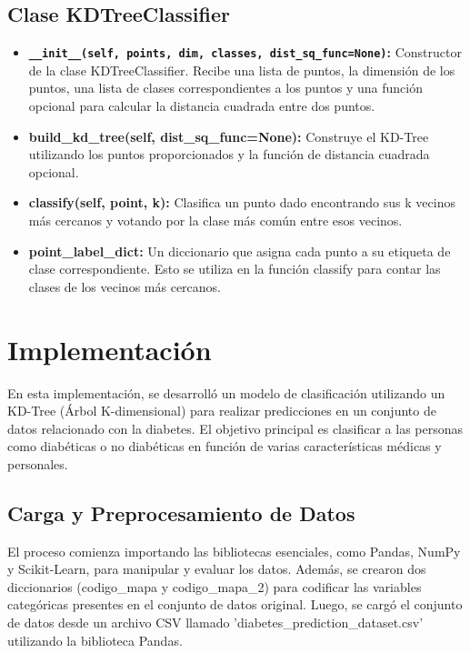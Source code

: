 \documentclass[]{article}
\begin{document}
\subsection{Clase KDTreeClassifier}
\begin{itemize}
	\item \textbf{\lstinline|__init__(self, points, dim, classes, dist_sq_func=None)|:} Constructor de la clase KDTreeClassifier. Recibe una lista de puntos, la dimensión de los puntos, una lista de clases correspondientes a los puntos y una función opcional para calcular la distancia cuadrada entre dos puntos.
	\item \textbf{build\_kd\_tree(self, dist\_sq\_func=None):} Construye el KD-Tree utilizando los puntos proporcionados y la función de distancia cuadrada opcional.
	\item \textbf{classify(self, point, k):} Clasifica un punto dado encontrando sus k vecinos más cercanos y votando por la clase más común entre esos vecinos.
	\item \textbf{point\_label\_dict:} Un diccionario que asigna cada punto a su etiqueta de clase correspondiente. Esto se utiliza en la función classify para contar las clases de los vecinos más cercanos.
\end{itemize}	
\section{Implementación}
En esta implementación, se desarrolló un modelo de clasificación utilizando un KD-Tree (Árbol K-dimensional) para realizar predicciones en un conjunto de datos relacionado con la diabetes. El objetivo principal es clasificar a las personas como diabéticas o no diabéticas en función de varias características médicas y personales.

\subsection{Carga y Preprocesamiento de Datos}

El proceso comienza importando las bibliotecas esenciales, como Pandas, NumPy y Scikit-Learn, para manipular y evaluar los datos. Además, se crearon dos diccionarios (codigo\_mapa y codigo\_mapa\_2) para codificar las variables categóricas presentes en el conjunto de datos original. Luego, se cargó el conjunto de datos desde un archivo CSV llamado 'diabetes\_prediction\_dataset.csv' utilizando la biblioteca Pandas.
\end{document}
